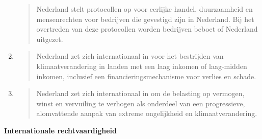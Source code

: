 \begin{enumerate}
  \begin{quote}
  Nederland stelt protocollen op voor eerlijke handel, duurzaamheid en
  mensenrechten voor bedrijven die gevestigd zijn in Nederland. Bij het
  overtreden van deze protocollen worden bedrijven beboet of Nederland
  uitgezet.
  \end{quote}
\item
  \begin{quote}
  Nederland zet zich internationaal in voor het bestrijden van
  klimaatverandering in landen met een laag inkomen of laag-midden
  inkomen, inclusief een financieringsmechanisme voor verlies en schade.
  \end{quote}
\item
  \begin{quote}
  Nederland zet zich internationaal in om de belasting op vermogen,
  winst en vervuiling te verhogen als onderdeel van een progressieve,
  alomvattende aanpak van extreme ongelijkheid en klimaatverandering.
  \end{quote}
\end{enumerate}

\textbf{Internationale rechtvaardigheid}

